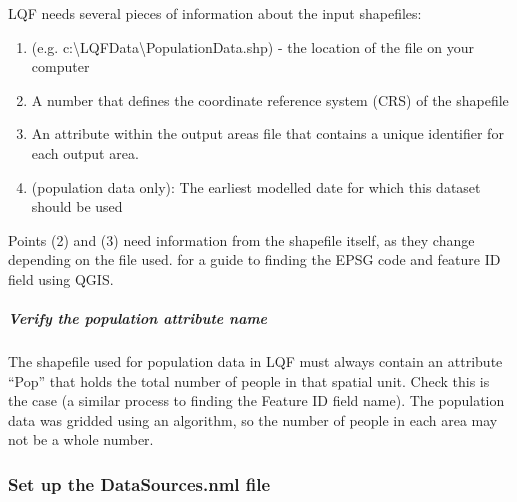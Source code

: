 \documentclass[letterpaper,10pt,english]{sphinxmanual}
\begin{document}
LQF needs several pieces of information about the input shapefiles:
\begin{enumerate}
\item {} 
 (e.g. c:\textbackslash{}LQFData\textbackslash{}PopulationData.shp) - the location
of the  file on your computer

\item {} 
 A number that defines the coordinate reference system
(CRS) of the shapefile

\item {} 
 An attribute within the output areas file that
contains a unique identifier for each output area.

\item {} 
 (population data only): The earliest modelled date for
which this dataset should be used

\end{enumerate}

Points (2) and (3) need information from the shapefile itself, as they
change depending on the file used. 
for a guide to finding the EPSG code and feature ID field using QGIS.


\subparagraph{Verify the population attribute name}
\label{\detokenize{Tutorials/LQF:verify-the-population-attribute-name}}
The shapefile used for population data in LQF must always contain an
attribute “Pop” that holds the total number of people in that spatial
unit. Check this is the case (a similar process to finding the Feature
ID field name). The population data was gridded using an algorithm, so
the number of people in each area may not be a whole number.


\subsubsection{Set up the DataSources.nml file}
\label{\detokenize{Tutorials/LQF:set-up-the-datasources-nml-file}}
\end{document}
